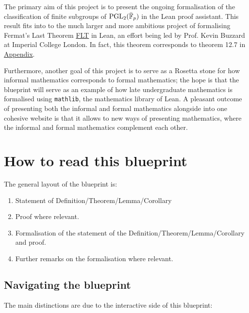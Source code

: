 The primary aim of this project is to present the ongoing formalisation of the classification of finite subgroups of $\operatorname{PGL}_2(\bar{\mathbb{F}}_p)$ in the Lean proof assistant. This result fits into to the much larger and more ambitious project
of formalising Fermat's Last Theorem \href{https://imperialcollegelondon.github.io/FLT/blueprint/}{FLT} in Lean, an effort being led by Prof. Kevin Buzzard at Imperial College London. In fact, this theorem corresponds to theorem 12.7 in \href{https://imperialcollegelondon.github.io/FLT/blueprint/ch_bestiary.html}{Appendix}.

Furthermore, another goal of this project is to serve as a Rosetta stone for how informal mathematics corresponds to formal mathematics; the hope is that the blueprint will serve as an example of how late undergraduate mathematics is formalised using \texttt{mathlib}, the mathematics library of Lean.
A pleasant outcome of presenting both the informal and formal mathematics alongside into one cohesive website is that it allows to new ways of presenting mathematics, where the informal and formal mathematics complement each other.


\section{How to read this blueprint}

The general layout of the blueprint is:

\begin{enumerate}
    \item Statement of Definition/Theorem/Lemma/Corollary
    \item Proof where relevant.
    \item Formalisation of the statement of the Definition/Theorem/Lemma/Corollary
    and proof.
    \item Further remarks on the formalisation where relevant.
\end{enumerate}
\subsection{Navigating the blueprint}

The main distinctions are due to the interactive side of this blueprint:

